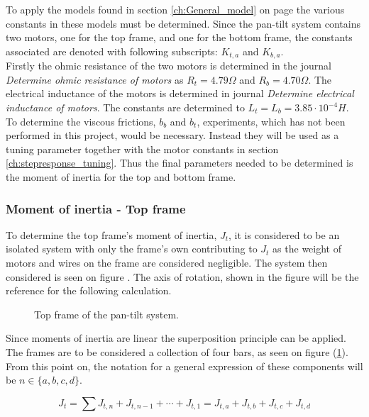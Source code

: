 \documentclass[../../main]{subfiles}
\begin{document}
To apply the models found in section \ref{ch:General_model} on page \pageref{ch:General_model} the various constants in these models must be determined. Since the pan-tilt system contains two motors, one for the top frame, and one for the bottom frame, the constants associated are denoted with following subscripts: $K_{t,a}$ and $K_{b,a}$. \\
Firstly the ohmic resistance of the two motors is determined in the journal \textit{Determine ohmic resistance of motors} as $R_t = 4.79 \si{\Omega}$ and $R_b = 4.70 \si{\Omega}$. The electrical inductance of the motors is determined  in journal \textit{Determine electrical inductance of motors}. The constants are determined to $L_t = L_b = 3.85\cdot 10^{-4} \si{H}$.
To determine the viscous frictions, $b_b$ and $b_t$, experiments, which has not been performed in this project, would be necessary. Instead they will be used as a tuning parameter together with the motor constants in section \ref{ch:stepresponse_tuning}. Thus the final parameters needed to be determined is the moment of inertia for the top and bottom frame.

\subsubsection{Moment of inertia - Top frame}
\label{sec:Top_frame_inertia}
To determine the top frame's moment of inertia, $J_{t}$, it is considered to be an isolated system with only the frame's own contributing to $J_{t}$ as the weight of motors and wires on the frame are considered negligible. The system then considered is seen on figure . The axis of rotation, shown in the figure  will be the reference for the following calculation.\\

\begin{figure}[H]
  \centering
  
  \caption{Top frame of the pan-tilt system.}
  \label{fig:TopFrame}
\end{figure}

Since moments of inertia are linear the superposition principle can be applied. The frames are to be considered a collection of four bars, as seen on figure (\ref{fig:TopFrame}). From this point on, the notation for a general expression of these components will be $n \in \{a,b,c,d\}$. 

\begin{equation}
  \label{eq:Top_frame_total_inertia_formula}
  J_t = \sum J_{t,n} + J_{t,n-1} + \dotsb + J_{t,1} = J_{t,a} + J_{t,b} + J_{t,c} + J_{t,d}
\end{equation}
\end{document}
